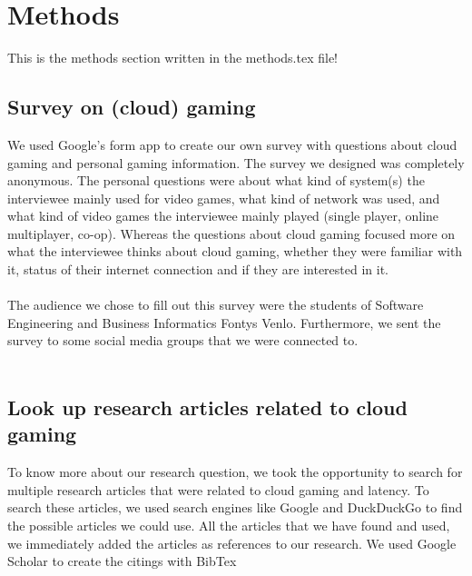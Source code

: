 \section{Methods}
This is the methods section written in the methods.tex file!

\subsection{Survey on (cloud) gaming}
We used Google's form app to create our own survey with questions about cloud gaming and personal gaming information. The survey we designed was completely anonymous. The personal questions were about what kind of system(s) the interviewee mainly used for video games, what kind of network was used, and what kind of video games the interviewee mainly played (single player, online multiplayer, co-op). Whereas the questions about cloud gaming focused more on what the interviewee thinks about cloud gaming, whether they were familiar with it, status of their internet connection and if they are interested in it.
\\\\
The audience we chose to fill out this survey were the students of Software Engineering and Business Informatics Fontys Venlo. Furthermore, we sent the survey to some social media groups that we were connected to.
\\\\
\subsection{Look up research articles related to cloud gaming}
To know more about our research question, we took the opportunity to search for multiple research articles that were related to cloud gaming and latency. To search these articles, we used search engines like Google and DuckDuckGo to find the possible articles we could use. All the articles that we have found and used, we immediately added the articles as references to our research. We used Google Scholar to create the citings with BibTex